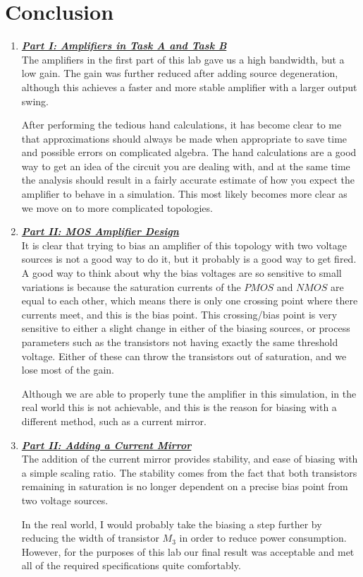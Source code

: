 \documentclass[12pt, fleqn]{article}
\begin{document}
\section{Conclusion}
    \begin{enumerate}[label=(\roman*)]
        \item
        {
        \underline{\textbf{\textit{Part I: Amplifiers in Task A and Task B}}}\\[0.25cm]
        The amplifiers in the first part of this lab gave us a high bandwidth, but a low gain.  The gain was further reduced after adding source degeneration, although this achieves a faster and more stable amplifier with a larger output swing.
        
        After performing the tedious hand calculations, it has become clear to me that approximations should always be made when appropriate to save time and possible errors on complicated algebra.  The hand calculations are a good way to get an idea of the circuit you are dealing with, and at the same time the analysis should result in a fairly accurate estimate of how you expect the amplifier to behave in a simulation.  This most likely becomes more clear as we move on to more complicated topologies.
        }
        \item
        {
        \underline{\textbf{\textit{Part II: MOS Amplifier Design}}}\\[0.25cm]
        It is clear that trying to bias an amplifier of this topology with two voltage sources is not a good way to do it, but it probably is a good way to get fired.  A good way to think about why the bias voltages are so sensitive to small variations is because the saturation currents of the $PMOS$ and $NMOS$ are equal to each other, which means there is only one crossing point where there currents meet, and this is the bias point.  This crossing/bias point is very sensitive to either a slight change in either of the biasing sources, or process parameters such as the transistors not having exactly the same threshold voltage.  Either of these can throw the transistors out of saturation, and we lose most of the gain.
        
        Although we are able to properly tune the amplifier in this simulation, in the real world this is not achievable, and this is the reason for biasing with a different method, such as a current mirror.
        }
        \item
        {
        \underline{\textbf{\textit{Part II: Adding a Current Mirror}}}\\[0.25cm]
        The addition of the current mirror provides stability, and ease of biasing with a simple scaling ratio.  The stability comes from the fact that both transistors remaining in saturation is no longer dependent on a precise bias point from two voltage sources.
        
        In the real world, I would probably take the biasing a step further by reducing the width of transistor $M_3$ in order to reduce power consumption.  However, for the purposes of this lab our final result was acceptable and met all of the required specifications quite comfortably.  
        }
    \end{enumerate}
\end{document}

